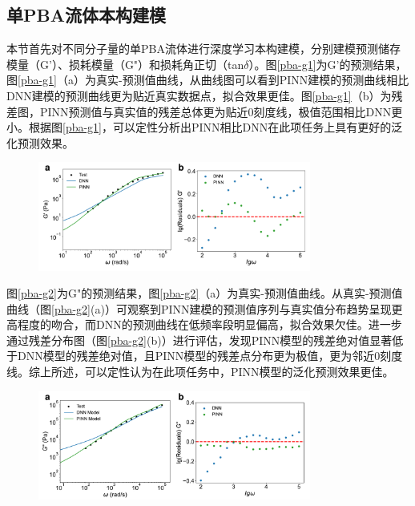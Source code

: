\subsection{单PBA流体本构建模}
本节首先对不同分子量的单PBA流体进行深度学习本构建模，分别建模预测储存模量（G'）、损耗模量（G"）和损耗角正切（tan$\delta$）。图\ref{pba-g1}为G'的预测结果，图\ref{pba-g1}（a）为真实-预测值曲线，从曲线图可以看到PINN建模的预测曲线相比DNN建模的预测曲线更为贴近真实数据点，拟合效果更佳。图\ref{pba-g1}（b）为残差图，PINN预测值与真实值的残差总体更为贴近0刻度线，极值范围相比DNN更小。根据图\ref{pba-g1}，可以定性分析出PINN相比DNN在此项任务上具有更好的泛化预测效果。
\begin{figure}[htbp]
  \centering
  \includegraphics[width=0.8\textwidth]{Fig/pba-g1.pdf}
\end{figure}

图\ref{pba-g2}为G"的预测结果，图\ref{pba-g2}（a）为真实-预测值曲线。从真实-预测值曲线（图\ref{pba-g2}(a)）可观察到PINN建模的预测值序列与真实值分布趋势呈现更高程度的吻合，而DNN的预测曲线在低频率段明显偏高，拟合效果欠佳。进一步通过残差分布图（图\ref{pba-g2}(b)）进行评估，发现PINN模型的残差绝对值显著低于DNN模型的残差绝对值，且PINN模型的残差点分布更为极值，更为邻近0刻度线。综上所述，可以定性认为在此项任务中，PINN模型的泛化预测效果更佳。
\begin{figure}[htbp]
  \centering
  \includegraphics[width=0.8\textwidth]{Fig/pba-g2.pdf}
\end{figure}

